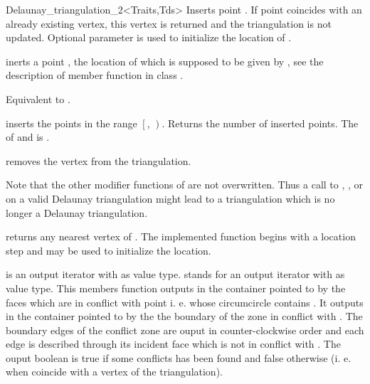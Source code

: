 \begin{ccRefClass}{Delaunay_triangulation_2<Traits,Tds>}
{Inserts  point .
If point  coincides with an already existing vertex, this 
vertex is returned and the triangulation is not updated.
Optional parameter  is used to initialize the location of .
}

{ inerts a point , the location of which is supposed to be
given by , see the description of member function
 in class .}

{Equivalent to .}

{inserts the points in the range
 $\left[\right.$, $\left.\right)$.
 Returns the number of inserted points.
 \ccPrecond The  of  and 
 is .}



{removes the vertex from the triangulation.}

Note that the other modifier functions  of
 are not overwritten.
Thus a  call to 
, ,
  or 
on a valid Delaunay triangulation might lead to a triangulation
which is no longer a Delaunay triangulation.


{returns any nearest vertex of . The implemented function
begins with a location step and
 may be used to initialize the location.}

{  is an output iterator with  as value type.
 stands for an output iterator with  as value type.
This members function outputs in the container pointed to by 
the faces which are in conflict with point 
i. e. whose circumcircle contains .
It outputs in the container pointed to by  the 
the boundary of the zone in conflict with .
The boundary edges
of the conflict  zone are ouput in counter-clockwise order
and each edge is described  through its incident face
which is not in conflict with .
The ouput boolean is true if some conflicts has been found and false
otherwise
(i. e. when  coincide with a vertex of the triangulation).}


\end{ccRefClass}
